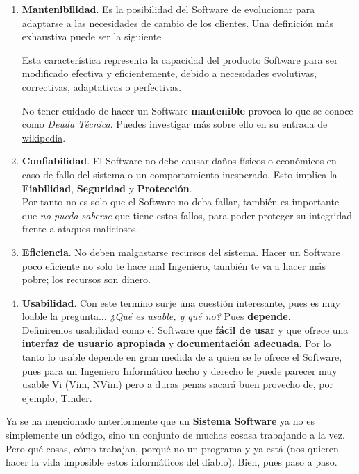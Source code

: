 \begin{enumerate}
    \item \textbf{Mantenibilidad}. Es la posibilidad del Software de evolucionar para adaptarse a las necesidades
    de cambio de los clientes. Una definición más exhaustiva puede ser la siguiente
    \begin{enfasis}
        Esta característica representa la capacidad del producto Software para ser modificado efectiva y
        eficientemente, debido a necesidades evolutivas, correctivas, adaptativas o perfectivas.
    \end{enfasis}
    No tener cuidado de hacer un Software \textbf{mantenible} provoca lo que se conoce como \textit{Deuda Técnica}.
    Puedes investigar más sobre ello en su entrada de \href{https://es.wikipedia.org/wiki/Deuda_t%C3%A9cnica}{wikipedia}.
    \item \textbf{Confiabilidad}. El Software no debe causar daños físicos o económicos en caso de fallo del sistema
     o un comportamiento inesperado. Esto implica la \textbf{Fiabilidad}, \textbf{Seguridad} y \textbf{Protección}. \\
     Por tanto no es solo que el Software no deba fallar, también es importante que \textit{no pueda saberse} que
     tiene estos fallos, para poder proteger su integridad frente a ataques maliciosos.
     \item \textbf{Eficiencia}. No deben malgastarse recursos del sistema. Hacer un Software poco eficiente no solo
     te hace mal Ingeniero, también te va a hacer más pobre; los recursos son dinero.
     \item \textbf{Usabilidad}. Con este termino surje una cuestión interesante, pues es muy loable la pregunta...
     \textit{¿Qué es usable, y qué no?} Pues \textbf{depende}. \\
     Definiremos usabilidad como el Software que \textbf{fácil de usar} y que ofrece una \textbf{interfaz de usuario
     apropiada} y \textbf{documentación adecuada}. Por lo tanto lo usable depende en gran medida de a quien se le 
     ofrece el Software, pues para un Ingeniero Informático hecho y derecho le puede parecer muy usable Vi 
     (Vim, NVim) pero a duras penas sacará buen provecho de, por ejemplo, Tinder.
\end{enumerate}

\newpage

Ya se ha mencionado anteriormente que un \textbf{Sistema Software} ya no es simplemente un código, sino un conjunto
de muchas cosasa trabajando a la vez. Pero qué cosas, cómo trabajan, porqué no un programa y ya está (nos quieren
hacer la vida imposible estos informáticos del diablo). Bien, pues paso a paso.

